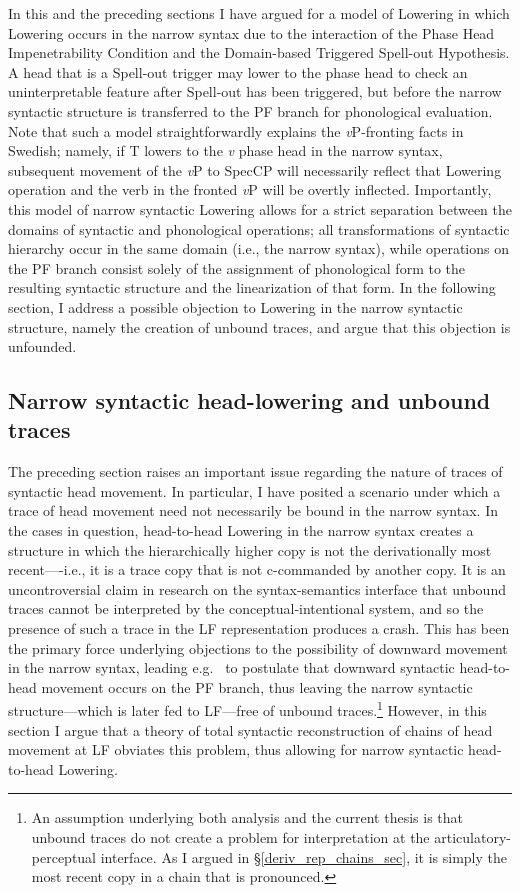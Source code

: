 In this and the preceding sections I have argued for a model of Lowering in which Lowering occurs in the narrow syntax due to the interaction of the Phase Head Impenetrability Condition and the Domain-based Triggered Spell-out Hypothesis. A head that is a Spell-out trigger may lower to the phase head to check an uninterpretable feature after Spell-out has been triggered, but before the narrow syntactic structure is transferred to the PF branch for phonological evaluation. Note that such a model straightforwardly explains the {\it v}P-fronting facts in Swedish; namely, if T lowers to the {\it v} phase head in the narrow syntax, subsequent movement of the {\it v}P to SpecCP will necessarily reflect that Lowering operation and the verb in the fronted {\it v}P will be overtly inflected. Importantly, this model of narrow syntactic Lowering allows for a strict separation between the domains of syntactic and phonological operations; all transformations of syntactic hierarchy occur in the same domain (i.e., the narrow syntax), while operations on the PF branch consist solely of the assignment of phonological form to the resulting syntactic structure and the linearization of that form. In the following section, I address a possible objection to Lowering in the narrow syntactic structure, namely the creation of unbound traces, and argue that this objection is unfounded.

\subsection{Narrow syntactic head-lowering and unbound traces}\label{head_phrase_trace_sec}
The preceding section raises an important issue regarding the nature of traces of syntactic head movement. In particular, I have posited a scenario under which a trace of head movement need not necessarily be bound in the narrow syntax. In the cases in question, head-to-head Lowering in the narrow syntax creates a structure in which the hierarchically higher copy is not the derivationally most recent----i.e., it is a trace copy that is not c-commanded by another copy. It is an uncontroversial claim in research on the syntax-semantics interface that unbound traces cannot be interpreted by the conceptual-intentional system, and so the presence of such a trace in the LF representation produces a crash. This has been the primary force underlying objections to the possibility of downward movement in the narrow syntax, leading e.g.\ \citet{embick_noyer2001} to postulate that downward syntactic head-to-head movement occurs on the PF branch, thus leaving the narrow syntactic structure---which is later fed to LF---free of unbound traces.\footnote{An assumption underlying both  analysis and the current thesis is that unbound traces do not create a problem for interpretation at the articulatory-perceptual interface. As I argued in \S\ref{deriv_rep_chains_sec}, it is simply the most recent copy in a chain that is pronounced.} However, in this section I argue that a theory of total syntactic reconstruction of chains of head movement at LF obviates this problem, thus allowing for narrow syntactic head-to-head Lowering.

